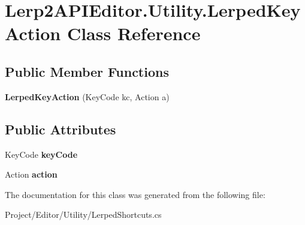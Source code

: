 \hypertarget{class_lerp2_a_p_i_editor_1_1_utility_1_1_lerped_key_action}{}\section{Lerp2\+A\+P\+I\+Editor.\+Utility.\+Lerped\+Key\+Action Class Reference}
\label{class_lerp2_a_p_i_editor_1_1_utility_1_1_lerped_key_action}
\subsection*{Public Member Functions}
\begin{DoxyCompactItemize}
\item 
\mbox{\label{class_lerp2_a_p_i_editor_1_1_utility_1_1_lerped_key_action_af1034728386c1896671ef10ee91779a5}} 
{\bfseries Lerped\+Key\+Action} (Key\+Code kc, Action a)
\end{DoxyCompactItemize}
\subsection*{Public Attributes}
\begin{DoxyCompactItemize}
\item 
\mbox{\label{class_lerp2_a_p_i_editor_1_1_utility_1_1_lerped_key_action_a30cbfef41ad0f5739a249a06848672b2}} 
Key\+Code {\bfseries key\+Code}
\item 
\mbox{\label{class_lerp2_a_p_i_editor_1_1_utility_1_1_lerped_key_action_a7b1a773c42808e56972b45ba2f11681d}} 
Action {\bfseries action}
\end{DoxyCompactItemize}


The documentation for this class was generated from the following file\+:\begin{DoxyCompactItemize}
\item 
Project/\+Editor/\+Utility/Lerped\+Shortcuts.\+cs\end{DoxyCompactItemize}
